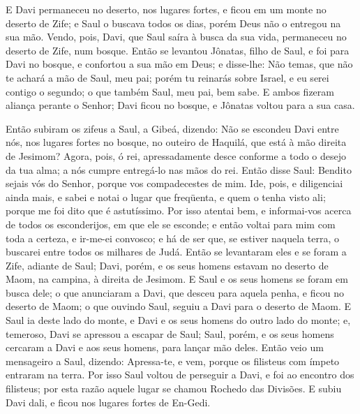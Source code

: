 E Davi permaneceu no deserto, nos lugares fortes, e ficou em um
monte no deserto de Zife; e Saul o buscava todos os dias, porém Deus
não o entregou na sua mão. Vendo, pois, Davi, que Saul saíra
à busca da sua vida, permaneceu no deserto de Zife, num bosque.
Então se levantou Jônatas, filho de Saul, e foi para Davi no
bosque, e confortou a sua mão em Deus; e disse-lhe: Não
temas, que não te achará a mão de Saul, meu pai; porém tu reinarás
sobre Israel, e eu serei contigo o segundo; o que também Saul, meu
pai, bem sabe. E ambos fizeram aliança perante o Senhor; Davi
ficou no bosque, e Jônatas voltou para a sua casa.

Então subiram os zifeus a Saul, a Gibeá, dizendo: Não se escondeu
Davi entre nós, nos lugares fortes no bosque, no outeiro de Haquilá,
que está à mão direita de Jesimom? Agora, pois, ó rei,
apressadamente desce conforme a todo o desejo da tua alma; a nós
cumpre entregá-lo nas mãos do rei. Então disse Saul: Bendito
sejais vós do Senhor, porque vos compadecestes de mim. Ide,
pois, e diligenciai ainda mais, e sabei e notai o lugar que
freqüenta, e quem o tenha visto ali; porque me foi dito que é
astutíssimo. Por isso atentai bem, e informai-vos acerca de
todos os esconderijos, em que ele se esconde; e então voltai para
mim com toda a certeza, e ir-me-ei convosco; e há de ser que, se
estiver naquela terra, o buscarei entre todos os milhares de Judá.
Então se levantaram eles e se foram a Zife, adiante de Saul;
Davi, porém, e os seus homens estavam no deserto de Maom, na
campina, à direita de Jesimom. E Saul e os seus homens se
foram em busca dele; o que anunciaram a Davi, que desceu para aquela
penha, e ficou no deserto de Maom; o que ouvindo Saul, seguiu a Davi
para o deserto de Maom. E Saul ia deste lado do monte, e Davi
e os seus homens do outro lado do monte; e, temeroso, Davi se
apressou a escapar de Saul; Saul, porém, e os seus homens cercaram a
Davi e aos seus homens, para lançar mão deles. Então veio um
mensageiro a Saul, dizendo: Apressa-te, e vem, porque os filisteus
com ímpeto entraram na terra. Por isso Saul voltou de
perseguir a Davi, e foi ao encontro dos filisteus; por esta razão
aquele lugar se chamou Rochedo das Divisões. E subiu Davi
dali, e ficou nos lugares fortes de En-Gedi.

\medskip

